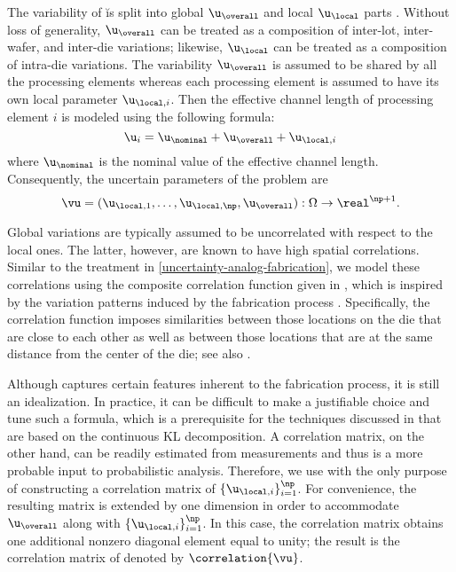 The variability of \u is split into global $\u_\overall$ and local $\u_\local$
parts \cite{shen2009, chandra2010, juan2012}. Without loss of generality,
$\u_\overall$ can be treated as a composition of inter-lot, inter-wafer, and
inter-die variations; likewise, $\u_\local$ can be treated as a composition of
intra-die variations. The variability $\u_\overall$ is assumed to be shared by
all the \np processing elements whereas each processing element is assumed to
have its own local parameter $\u_{\local, i}$. Then the effective channel length
of processing element $i$ is modeled using the following formula:
\[
  \u_i = \u_\nominal + \u_\overall + \u_{\local, i}
\]
where $\u_\nominal$ is the nominal value of the effective channel length.
Consequently, the uncertain parameters of the problem are
\[
  \vu = (\u_{\local, 1}, \dotsc, \u_{\local, \np}, \u_\overall): \Omega \to \real^{\np + 1}.
\]

Global variations are typically assumed to be uncorrelated with respect to the
local ones. The latter, however, are known to have high spatial correlations.
Similar to the treatment in \cref{uncertainty-analog-fabrication}, we model
these correlations using the composite correlation function given in
, which is inspired by the variation patterns induced by
the fabrication process \cite{friedberg2005, chandrakasan2000, cheng2011}.
Specifically, the correlation function imposes similarities between those
locations on the die that are close to each other as well as between those
locations that are at the same distance from the center of the die; see also
\cite{ghanem1991, ghanta2006, bhardwaj2008, huang2009a, lee2013}.

Although  captures certain features inherent to the
fabrication process, it is still an idealization. In practice, it can be
difficult to make a justifiable choice and tune such a formula, which is a
prerequisite for the techniques discussed in  that are based
on the continuous \ac{KL} decomposition. A correlation matrix, on the other
hand, can be readily estimated from measurements and thus is a more probable
input to probabilistic analysis. Therefore, we use  with
the only purpose of constructing a correlation matrix of $\{ \u_{\local, i}
\}_{i = 1}^\np$. For convenience, the resulting matrix is extended by one
dimension in order to accommodate $\u_\overall$ along with $\{ \u_{\local, i}
\}_{i = 1}^\np$. In this case, the correlation matrix obtains one additional
nonzero diagonal element equal to unity; the result is the correlation matrix of
\vu denoted by $\correlation{\vu}$.

